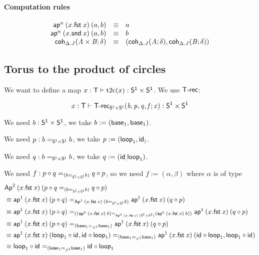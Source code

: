 \paragraph{Computation rules}

\[
\begin{array}{rcl}
  \mathsf{ap}^{n} \: {(x.\mathit{\mathsf{fst} \: x})} \: {(a,b)} & \equiv & a\\
  \mathsf{ap}^{n} \: {(x.\mathit{\mathsf{snd} \: x})} \: {(a,b)} & \equiv & b\\
  \mathsf{coh}_{\Delta.J} \mathit{(A\times B;\delta)} & \equiv &
  (\mathsf{coh}_{\Delta.J} \mathit{(A;\delta)},\mathsf{coh}_{\Delta.J} \mathit{(B;\delta)})
\end{array}
\]

\subsection{Torus to the product of circles}

\newcommand{\ttoc}{\mathrm{t2c}}
\newcommand{\ctot}{\mathrm{c2t}}
\newcommand{\PP}{\dsd{S^1\times S^1}}
\newcommand{\unitlr}{\mathrm{unitlr}}
\newcommand{\unitrl}{\mathrm{unitrl}}

We want to define a map $x:\dsd{T}\vdash\ttoc(x):\PP$. We use
$\mathsf{T\text{-}rec}$:

\[\ofglob{x:\dsd{T}}{\dsd{T\text{-}rec}_{\PP}(b,p,q,f;x)}{\PP}\]

We need $b:\PP$, we take $b:=(\mathsf{base}_{1},\mathsf{base}_{1})$.

We need $p:\homj{\PP}{b}{b}$, we take $p:=(\mathsf{loop}_{1},\mathsf{id}_{)}$.

We need $q:\homj{\PP}{b}{b}$, we take $q:=(\mathsf{id}_{,}\mathsf{loop}_{1})$.

We need $f:\homj{(\homj{\PP}{b}{b})}{p\circ q}{q\circ p}$, so we need
$f:=(\alpha, \beta)$ where $\alpha$ is of type
\begin{align*}
  &\Apn{2}{(x.\fst x)}{(\homj{(\homj{\PP}{b}{b})}{p\circ q}{q\circ p})}\\
  &\equiv \homj{\Apn{1}{(x.\fst x)}(\homj{\PP}{b}{b})}
  {\apn{1}{(x.\fst x)}{(p\circ q)}}{\apn{1}{(x.\fst x)}{(q\circ p)}} \\
  &\equiv \homj{(\homj{\Apn{0}{(x.\fst x)}(\PP)}{(\apn{0}{(x.\fst x)}b)}
    {(\apn{0}{(x.\fst x)}b)})}
  {\apn{1}{(x.\fst x)}{(p\circ q)}}{\apn{1}{(x.\fst x)}{(q\circ p)}} \\
  &\equiv \homj{(\homj{S^1}{\base{1}}{\base{1}})}
  {\apn{1}{(x.\fst x)}{(p\circ q)}}{\apn{1}{(x.\fst x)}{(q\circ p)}} \\
  &\equiv \homj{(\homj{S^1}{\base{1}}{\base{1}})}
  {\apn{1}{(x.\fst x)}{(\lp{1}\circ\id{},\id{}\circ\lp{1})}}
  {\apn{1}{(x.\fst x)}{(\id{}\circ\lp{1}, \lp{1}\circ\id{})}} \\
  &\equiv \homj{(\homj{S^1}{\base{1}}{\base{1}})}
  {\lp{1}\circ\id{}}
  {\id{} \circ\lp{1}} \\
\end{align*}

